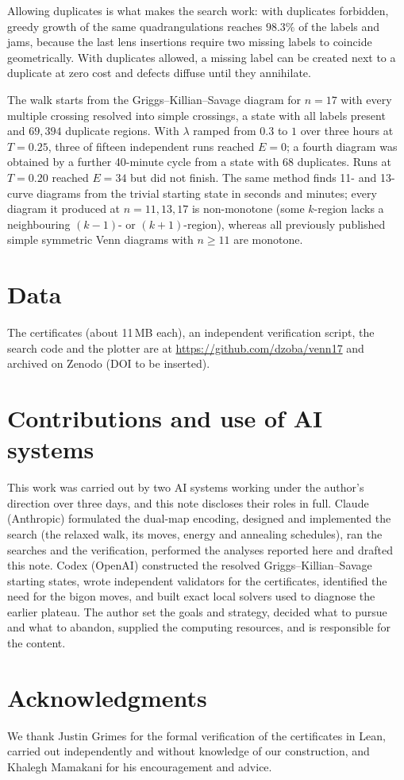 \documentclass[11pt]{article}
\begin{document}
Allowing duplicates is what makes the search work: with duplicates forbidden, greedy growth of the same
quadrangulations reaches $98.3\%$ of the labels and jams, because the last lens insertions require two missing labels
to coincide geometrically. With duplicates allowed, a missing label can be created next to a duplicate at zero cost and
defects diffuse until they annihilate.

The walk starts from the Griggs--Killian--Savage diagram for $n=17$ with every multiple crossing resolved into simple
crossings, a state with all labels present and $69{,}394$ duplicate regions. With $\lambda$ ramped from $0.3$ to $1$ over
three hours at $T=0.25$, three of fifteen independent runs reached $E=0$; a fourth diagram was obtained by a further
40-minute cycle from a state with $68$ duplicates. Runs at $T=0.20$ reached $E=34$ but did not finish. The same method
finds 11- and 13-curve diagrams from the trivial starting state in seconds and minutes; every diagram it produced at
$n=11,13,17$ is non-monotone (some $k$-region lacks a neighbouring $(k{-}1)$- or $(k{+}1)$-region), whereas all previously
published simple symmetric Venn diagrams with $n\ge 11$ are monotone.

\section{Data}
The certificates (about 11\,MB each), an independent verification script, the search code and the plotter are at \url{https://github.com/dzoba/venn17} and archived on Zenodo (DOI to be inserted).

\section*{Contributions and use of AI systems}
This work was carried out by two AI systems working under the author's direction over three days, and this note
discloses their roles in full. Claude (Anthropic) formulated the dual-map encoding, designed and implemented the search
(the relaxed walk, its moves, energy and annealing schedules), ran the searches and the verification, performed the
analyses reported here and drafted this note. Codex (OpenAI) constructed the resolved Griggs--Killian--Savage starting
states, wrote independent validators for the certificates, identified the need for the bigon moves, and built exact
local solvers used to diagnose the earlier plateau. The author set the goals and strategy, decided what to pursue and
what to abandon, supplied the computing resources, and is responsible for the content.

\section*{Acknowledgments}
We thank Justin Grimes for the formal verification of the certificates in Lean, carried out independently and without
knowledge of our construction, and Khalegh Mamakani for his encouragement and advice.
\end{document}
